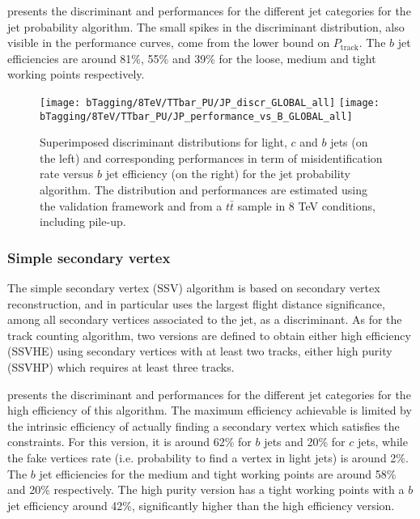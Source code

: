      presents the discriminant and
    performances for the different jet categories for the jet probability algorithm. The
    small spikes in the discriminant distribution, also visible in the performance curves,
    come from the lower bound on $P_\text{track}$. The $b$ jet efficiencies are around
    81\%, 55\% and 39\% for the loose, medium and tight working points respectively.

    \begin{figure}[th!]
        \centering
        \begin{minipage}{\textwidth}
        \texttt{[image: bTagging/8TeV/TTbar\_PU/JP\_discr\_GLOBAL\_all]}
        \texttt{[image: bTagging/8TeV/TTbar\_PU/JP\_performance\_vs\_B\_GLOBAL\_all]}
        \end{minipage}
                \caption{Superimposed discriminant distributions for light, $c$ and $b$ jets (on
        the left) and corresponding performances in term of misidentification rate versus $b$ jet efficiency
        (on the right) for the jet probability algorithm.
        The distribution and performances are estimated using the validation framework and from
        a $t\bar{t}$ sample in 8 TeV conditions, including pile-up.}
        \label{fig:bTagging/perfJP}
    \end{figure}

        \subsubsection{Simple secondary vertex}

    The simple secondary vertex (SSV) algorithm is based on secondary vertex reconstruction,
    and in particular uses the largest flight distance significance, among all secondary
    vertices associated to the jet, as a discriminant. As for the track counting algorithm, two versions are defined
    to obtain either high efficiency (SSVHE) using secondary vertices with at least two
    tracks, either high purity (SSVHP) which requires at least three tracks.

     presents the discriminant and
    performances for the different jet categories for the high efficiency of this algorithm.
    The maximum efficiency achievable is limited by the intrinsic efficiency of
    actually finding a secondary vertex which satisfies the constraints. For this version,
    it is around 62\% for $b$ jets and 20\% for $c$ jets, while the fake vertices rate (i.e.
    probability to find a vertex in light jets) is around 2\%. The $b$ jet efficiencies
    for the medium and tight working points are around 58\% and 20\% respectively. The
    high purity version has a tight working points with a $b$ jet efficiency around
    42\%, significantly higher than the high efficiency version.

